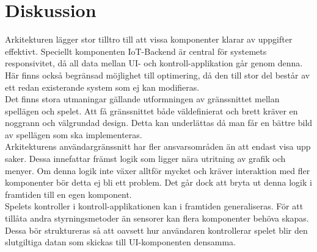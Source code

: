 \section{Diskussion}
Arkitekturen lägger stor tilltro till att vissa komponenter klarar av uppgifter effektivt. Speciellt komponenten IoT-Backend är central för systemets responsivitet, då all data mellan UI- och kontroll-applikation går genom denna. Här finns också begränsad möjlighet till optimering, då den till stor del består av ett redan existerande system som ej kan modifieras.\\

Det finns stora utmaningar gällande utformningen av gränssnittet mellan spellägen och spelet. Att få gränssnittet både väldefinierat och brett kräver en noggrann och välgrundad design. Detta kan underlättas då man får en bättre bild av spellägen som ska implementeras.\\

Arkitekturens användargränssnitt har fler ansvarsområden än att endast visa upp saker. Dessa innefattar främst logik som ligger nära utritning av grafik och menyer. Om denna logik inte växer alltför mycket och kräver interaktion med fler komponenter bör detta ej bli ett problem. Det går dock att bryta ut denna logik i framtiden till en egen komponent.\\

Spelets kontroller i kontroll-applikationen kan i framtiden generaliseras. För att tillåta andra styrningsmetoder än sensorer kan flera komponenter behöva skapas. Dessa bör struktureras så att oavsett hur användaren kontrollerar spelet blir den slutgiltiga datan som skickas till UI-komponenten densamma.
